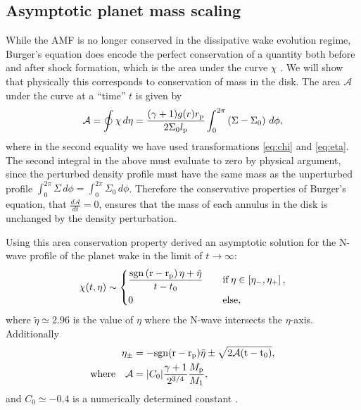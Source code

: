 \subsection{Asymptotic planet mass scaling} \label{sec:asymptotic_N_wave}

While the AMF is no longer conserved in the dissipative wake evolution regime, Burger's equation does encode the perfect conservation of a quantity both before and after shock formation, which is the area under the curve $\chi$ \citep{landau1987,whitham1999}.
We will show that physically this corresponds to conservation of mass in the disk.
The area $\mathcal{A}$ under the curve at a ``time'' $t$ is given by
\begin{align}
    \mathcal{A} = \oint \chi \, d\eta = \frac{(\gamma + 1)g(r)r_{\rm p}}{2 \Sigma_0 l_{\rm p}} \int_0^{2\pi}  \left( \Sigma - \Sigma_0 \right) \, d\phi, 
\end{align}
where in the second equality we have used transformations \eqref{eq:chi} and \eqref{eq:eta}.
The second integral in the above must evaluate to zero by physical argument, since the perturbed density profile must have the same mass as the unperturbed profile $\int_0^{2 \pi} \Sigma \, d\phi = \int_0^{2 \pi} \Sigma_0 \, d\phi$.
Therefore the conservative properties of Burger's equation, that $\frac{d\mathcal{A}}{dt}=0$, ensures that the mass of each annulus in the disk is unchanged by the density perturbation.

Using this area conservation property \citet{bollati2021} derived an asymptotic solution for the N-wave profile of the planet wake in the limit of $t\rightarrow\infty$:
\begin{align}
    \chi(t, \eta) \sim \begin{dcases}
        \frac{\rm{sgn}\left(r - r_{\rm p}\right) \eta + \tilde{\eta}}{t - t_0} \quad &\rm{if} \, \eta \in \left[\eta_-, \eta_+ \right], \\
        0 \quad &\rm{else},
    \end{dcases}
\end{align}
where $\tilde{\eta} \simeq 2.96$ is the value of $\eta$ where the N-wave intersects the $\eta$-axis.
Additionally
\begin{align} 
    \eta_\pm &= - \rm{sgn}(r - r_{\rm p}) \tilde{\eta} \pm \sqrt{2 \mathcal{A} (t - t_0)}, \\
    \rm{where} \quad \mathcal{A} &= |C_0| \frac{\gamma + 1}{2^{3/4}} \frac{M_{\rm p}}{M_1},
\end{align}
and $C_0 \simeq -0.4$ is a numerically determined constant \citep{bollati2020}.


